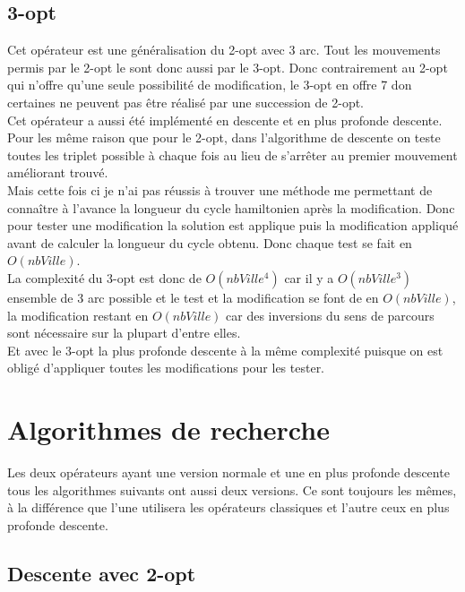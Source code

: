 \documentclass[12pt,a4paper]{article}
\begin{document}
\subsection{3-opt}
Cet opérateur est une généralisation du 2-opt avec 3 arc. Tout les mouvements permis par le 2-opt le sont donc aussi par le 3-opt. Donc contrairement au 2-opt qui n'offre qu'une seule possibilité de modification, le 3-opt en offre 7 don certaines ne peuvent pas être réalisé par une succession de 2-opt.\\

Cet opérateur a aussi été implémenté en descente et en plus profonde descente.\\
Pour les même raison que pour le 2-opt, dans l'algorithme de descente on teste toutes les triplet possible à chaque fois au lieu de s’arrêter au premier mouvement améliorant trouvé.\\
Mais cette fois ci je n'ai pas réussis à trouver une méthode me permettant de connaître à l'avance la longueur du cycle hamiltonien après la modification. Donc pour tester une modification la solution est applique puis la modification appliqué avant de calculer la longueur du cycle obtenu. Donc chaque test se fait en $O(nbVille)$.\\
La complexité du 3-opt est donc de $O(nbVille^4)$ car il y a $O(nbVille^3)$ ensemble de 3 arc possible et le test et la modification se font de en $O(nbVille)$, la modification restant en $O(nbVille)$ car des inversions du sens de parcours sont nécessaire sur la plupart d'entre elles.\\
Et avec le 3-opt la plus profonde descente à la même complexité puisque on est obligé d'appliquer toutes les modifications pour les tester.\\

\section{Algorithmes de recherche}

Les deux opérateurs ayant une version normale et une en plus profonde descente tous les algorithmes suivants ont aussi deux versions. Ce sont toujours les mêmes, à la différence que l'une utilisera les opérateurs classiques et l'autre ceux en plus profonde descente.

\subsection{Descente avec 2-opt}
\end{document}
